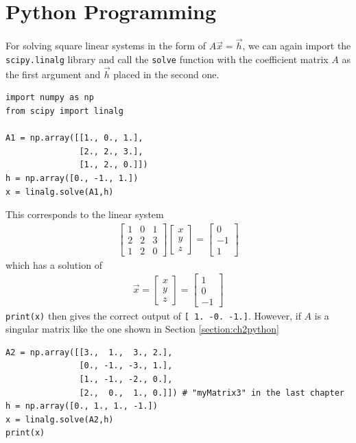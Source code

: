 \section{Python Programming}
\label{section:ch3python}
For solving square linear systems in the form of $A\vec{x} = \vec{h}$, we can again import the \verb|scipy.linalg| library and call the \verb|solve| function with the coefficient matrix $A$ as the first argument and $\vec{h}$ placed in the second one.
\begin{lstlisting}
import numpy as np
from scipy import linalg

A1 = np.array([[1., 0., 1.],
               [2., 2., 3.],
               [1., 2., 0.]])
h = np.array([0., -1., 1.])
x = linalg.solve(A1,h)
\end{lstlisting}
This corresponds to the linear system
\begin{align*}
\begin{bmatrix}
1 & 0 & 1 \\
2 & 2 & 3 \\
1 & 2 & 0
\end{bmatrix}
\begin{bmatrix}
x \\
y \\ 
z
\end{bmatrix}
=
\begin{bmatrix}
0 \\
-1 \\ 
1
\end{bmatrix}
\end{align*}
which has a solution of
\begin{align*}
\vec{x}
=
\begin{bmatrix}
x \\
y \\ 
z
\end{bmatrix}
=
\begin{bmatrix}
1 \\
0 \\
-1
\end{bmatrix}    
\end{align*}
\verb|print(x)| then gives the correct output of \verb|[ 1. -0. -1.]|. However, if $A$ is a singular matrix like the one shown in Section \ref{section:ch2python}
\begin{lstlisting}
A2 = np.array([[3.,  1.,  3., 2.],
               [0., -1., -3., 1.],
               [1., -1., -2., 0.],
               [2.,  0.,  1., 0.]]) # "myMatrix3" in the last chapter
h = np.array([0., 1., 1., -1.])
x = linalg.solve(A2,h)      
print(x)
\end{lstlisting}
